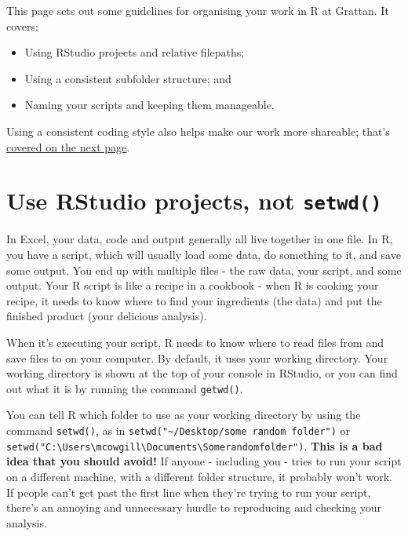 \documentclass[]{book}
\providecommand{\tightlist}{%
  \setlength{\itemsep}{0pt}\setlength{\parskip}{0pt}}
\begin{document}
This page sets out some guidelines for organising your work in R at Grattan. It covers:

\begin{itemize}
\tightlist
\item
  Using RStudio projects and relative filepaths;
\item
  Using a consistent subfolder structure; and
\item
  Naming your scripts and keeping them manageable.
\end{itemize}

Using a consistent coding style also helps make our work more shareable; that's \protect\hyperlink{coding-style}{covered on the next page}.

\hypertarget{rproj}{%
\section{\texorpdfstring{Use RStudio projects, not \texttt{setwd()}}{Use RStudio projects, not setwd()}}\label{rproj}}

In Excel, your data, code and output generally all live together in one file. In R, you have a script, which will usually load some data, do something to it, and save some output. You end up with multiple files - the raw data, your script, and some output. Your R script is like a recipe in a cookbook - when R is cooking your recipe, it needs to know where to find your ingredients (the data) and put the finished product (your delicious analysis).

When it's executing your script, R needs to know where to read files from and save files to on your computer. By default, it uses your working directory. Your working directory is shown at the top of your console in RStudio, or you can find out what it is by running the command \texttt{getwd()}.

You can tell R which folder to use as your working directory by using the command \texttt{setwd()}, as in \texttt{setwd("\textasciitilde{}/Desktop/some\ random\ folder")} or \texttt{setwd("C:\textbackslash{}Users\textbackslash{}mcowgill\textbackslash{}Documents\textbackslash{}Somerandomfolder")}. \textbf{This is a bad idea that you should avoid!} If anyone - including you - tries to run your script on a different machine, with a different folder structure, it probably won't work. If people can't get past the first line when they're trying to run your script, there's an annoying and unnecessary hurdle to reproducing and checking your analysis.
\end{document}
